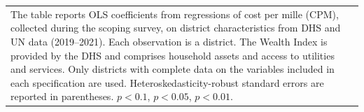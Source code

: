 {{\begin{tabular}{l*{9}{c}}
\hline\hline
\multicolumn{10}{p{1.12\linewidth}}{\scriptsize The table reports OLS coefficients from regressions of cost per mille (CPM), collected during the scoping survey, on district characteristics from DHS and UN data (2019--2021). Each observation is a district. The Wealth Index is provided by the DHS and comprises household assets and access to utilities and services. Only districts with complete data on the variables included in each specification are used. Heteroskedasticity-robust standard errors are reported in parentheses. \sym{*} \(p<0.1\), \sym{**} \(p<0.05\), \sym{***} \(p<0.01\).}\\
\end{tabular}
}%

}





